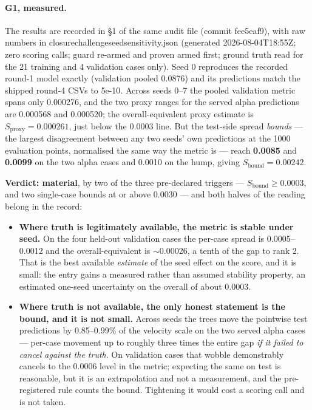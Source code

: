 \documentclass[11pt,a4paper]{article}
\newcommand{\breakus}{\textunderscore\allowbreak}
\newcommand{\code}[1]{{\small\ttfamily\let\_\breakus #1}}
\newcommand{\artifact}[1]{{\footnotesize\ttfamily\let\_\breakus #1}}
\begin{document}
\paragraph{G1, measured.} The results are recorded in \S1 of the same audit file (commit
\code{fee5eaf9}), with raw numbers in
\artifact{closure\_challenge\_seed\_sensitivity.json} (generated
2026-08-04T18:55Z; zero scoring calls; guard re-armed and proven armed first; ground truth
read for the 21 training and 4 validation cases only). Seed 0 reproduces the recorded
round-1 model exactly (validation pooled 0.0876) and its predictions match the shipped
round-4 CSVs to 5e-10. Across seeds 0--7 the pooled validation metric spans only 0.000276,
and the two proxy ranges for the served \code{alpha\_15} predictions are 0.000568 and
0.000520; the overall-equivalent proxy estimate is $S_{\text{proxy}} = 0.000261$, just below
the 0.0003 line. But the test-side spread \emph{bounds} --- the largest disagreement between
any two seeds' own predictions at the 1000 evaluation points, normalised the same way the
metric is --- reach \textbf{0.0085} and \textbf{0.0099} on the two \code{alpha\_15} cases
and 0.0010 on the hump, giving $S_{\text{bound}} = 0.00242$.

\textbf{Verdict: material}, by two of the three pre-declared triggers --- $S_{\text{bound}}
\geq 0.0003$, and two single-case bounds at or above 0.0030 --- and both halves of the
reading belong in the record:

\begin{itemize}
\item \textbf{Where truth is legitimately available, the metric is stable under seed.} On
  the four held-out validation cases the per-case spread is 0.0005--0.0012 and the
  overall-equivalent is $\sim$0.00026, a tenth of the gap to rank 2. That is the best
  available \emph{estimate} of the seed effect on the score, and it is small: the entry
  gains a measured rather than assumed stability property, an estimated one-seed
  uncertainty on the overall of about 0.0003.
\item \textbf{Where truth is not available, the only honest statement is the bound, and it
  is not small.} Across seeds the trees move the pointwise test predictions by 0.85--0.99\%
  of the velocity scale on the two served \code{alpha\_15} cases --- per-case movement up to
  roughly three times the entire gap \emph{if it failed to cancel against the truth}. On
  validation cases that wobble demonstrably cancels to the 0.0006 level in the metric;
  expecting the same on test is reasonable, but it is an extrapolation and not a
  measurement, and the pre-registered rule counts the bound. Tightening it would cost a
  scoring call and is not taken.
\end{itemize}
\end{document}
